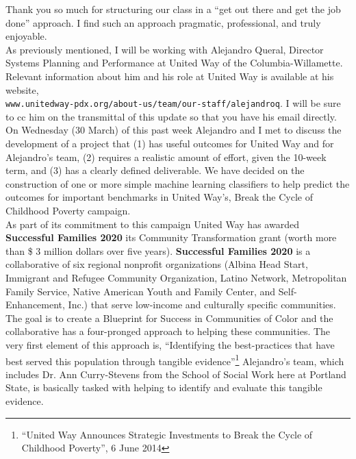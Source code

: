 \documentclass[letterpaper,11pt]{texMemo}
\begin{document}
\maketitle
Thank you so much for structuring our class in a \enquote{get out there and get the job done} approach. I find such an approach pragmatic, professional, and truly enjoyable.\\

As previously mentioned, I will be working with Alejandro Queral, Director Systems Planning and Performance at United Way of the Columbia-Willamette. Relevant information about him and his role at United Way is available at his website,\\
 \verb!www.unitedway-pdx.org/about-us/team/our-staff/alejandroq!. I will be sure to cc him on the transmittal of this update so that you have his email directly.\\
 
On Wednesday (30 March) of this past week Alejandro and I met to discuss the development of a project that (1) has useful outcomes for United Way and for Alejandro's team, (2) requires a realistic amount of effort, given the 10-week term, and (3) has a clearly defined deliverable. We have decided on the construction of one or more simple machine learning classifiers to help predict the outcomes for important benchmarks in United Way's, Break the Cycle of Childhood Poverty campaign.\\

As part of its commitment to this campaign United Way has awarded \textbf{Successful Families 2020} its Community Transformation grant (worth more than \$ 3 million dollars over five years). \textbf{Successful Families 2020} is a collaborative of six regional nonprofit organizations (Albina Head Start, Immigrant and Refugee Community Organization, Latino Network, Metropolitan Family Service, Native American Youth and Family Center, and Self-Enhancement, Inc.) that serve low-income and culturally specific communities. The goal is to create a Blueprint for Success in Communities of Color and the collaborative has a four-pronged approach to helping these communities. The very first element of this approach is, \enquote{Identifying the best-practices that have best served this population through tangible evidence}\footnote{\enquote{United Way Announces Strategic Investments to Break the Cycle of Childhood Poverty}, 6 June 2014} Alejandro's team, which includes Dr. Ann Curry-Stevens from the School of Social Work here at Portland State, is basically tasked with helping to identify and evaluate this tangible evidence.\\
\end{document}
